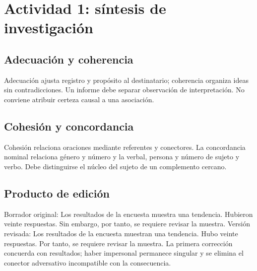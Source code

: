 \def\uadectitulo{Redacción indirecta}


\portadaUAdeC
\section{Actividad 1: síntesis de investigación}
\subsection{Adecuación y coherencia}
Adecuación ajusta registro y propósito al destinatario; coherencia organiza ideas sin contradicciones. Un informe debe separar observación de interpretación. No conviene atribuir certeza causal a una asociación.
\subsection{Cohesión y concordancia}
Cohesión relaciona oraciones mediante referentes y conectores. La concordancia nominal relaciona género y número y la verbal, persona y número de sujeto y verbo. Debe distinguirse el núcleo del sujeto de un complemento cercano.
\subsection{Producto de edición}
Borrador original: Los resultados de la encuesta muestra una tendencia. Hubieron veinte respuestas. Sin embargo, por tanto, se requiere revisar la muestra. Versión revisada: Los resultados de la encuesta muestran una tendencia. Hubo veinte respuestas. Por tanto, se requiere revisar la muestra. La primera corrección concuerda con resultados; haber impersonal permanece singular y se elimina el conector adversativo incompatible con la consecuencia.
